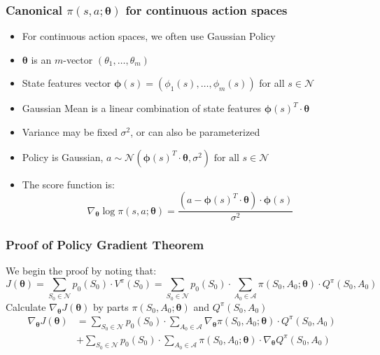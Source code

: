 \documentclass[handout]{beamer}
\begin{document}
\begin{frame}
\frametitle{Canonical $\pi(s,a; \bm{\theta})$ for continuous action spaces}
\pause
\begin{itemize}[<+->]
\item For continuous action spaces, we often use Gaussian Policy
\item $\bm{\theta}$ is an $m$-vector $(\theta_1, \ldots, \theta_m)$
\item State features vector $\bm{\phi}(s) = (\phi_1(s), \ldots, \phi_m(s))$ for all $s \in \mathcal{N}$
\item Gaussian Mean is a linear combination of state features $\bm{\phi}(s)^T \cdot \bm{\theta}$
\item Variance may be fixed $\sigma^2$, or can also be parameterized
\item Policy is Gaussian, $a \sim \mathcal{N}(\bm{\phi}(s)^T \cdot \bm{\theta}, \sigma^2) \mbox{ for all } s \in \mathcal{N}$
\item The score function is:
$$\nabla_{\bm{\theta}} \log \pi(s,a; \bm{\theta}) = \frac {(a - \bm{\phi}(s)^T \cdot \bm{\theta}) \cdot \bm{\phi}(s)} {\sigma^2}$$
\end{itemize}
\end{frame}

\begin{frame}
\frametitle{Proof of Policy Gradient Theorem}
\pause
We begin the proof by noting that:
$$J(\bm{\theta}) = \sum_{S_0 \in \mathcal{N}} p_0(S_0) \cdot V^{\pi}(S_0)  = \sum_{S_0 \in \mathcal{N}} p_0(S_0) \cdot \sum_{A_0 \in \mathcal{A}} \pi(S_0, A_0; \bm{\theta}) \cdot Q^{\pi}(S_0, A_0)$$
\pause
Calculate $\nabla_{\bm{\theta}} J(\bm{\theta})$ by parts $\pi(S_0, A_0; \bm{\theta})$ and $Q^{\pi}(S_0, A_0)$
\pause
\begin{align*}
\nabla_{\bm{\theta}} J(\bm{\theta}) & = \sum_{S_0 \in \mathcal{N}} p_0(S_0) \cdot  \sum_{A_0 \in \mathcal{A}} \nabla_{\bm{\theta}} \pi(S_0, A_0; \bm{\theta}) \cdot Q^{\pi}(S_0, A_0) \\
& + \sum_{S_0 \in \mathcal{N}} p_0(S_0) \cdot \sum_{A_0 \in \mathcal{A}} \pi(S_0, A_0; \bm{\theta}) \cdot \nabla_{\bm{\theta}} Q^{\pi}(S_0, A_0)
\end{align*}
\end{frame}
\end{document}
